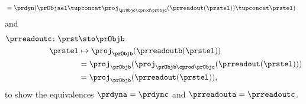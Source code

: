 \begin{example}
\begin{equation*}
\begin{aligned}
                                              & =\prdyn(\prObjael \tupconcat \proj_{\prObjc\cprod \prObjd}(\prreadout(\prstel)) \tupconcat \prstel)
        \end{aligned}
    \end{equation*}
    and
    \begin{equation*}
        \begin{aligned}
            \prreadoutc\colon \prst & \sto \prObjb \\
            \prstel                 & \mapsto
            \proj_\prObjb(\prreadoutb(\prstel)) \\
                                    & =\proj_\prObjb(\proj_{\prObjb\cprod \prObjc} (\prreadout(\prstel))) \\
                                    & =\proj_\prObjb(\prreadout(\prstel)),
        \end{aligned}
    \end{equation*}
    to show the equivalences $\prdyna=\prdync$ and $\prreadouta=\prreadoutc$.


\end{example}
